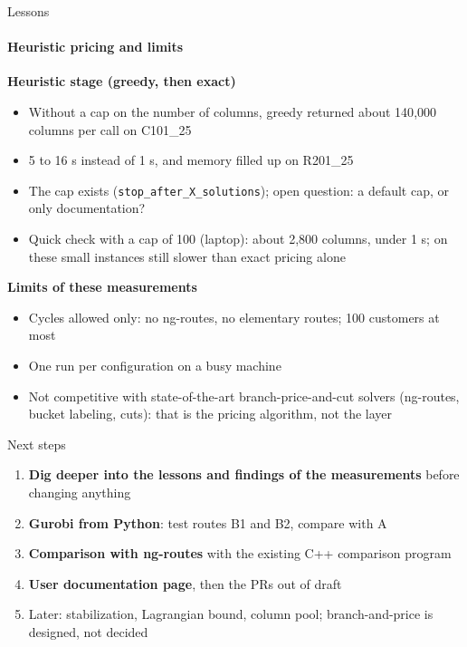 \documentclass[aspectratio=169]{beamer}
\begin{document}
\begin{frame}{Lessons}
  \framesubtitle{Heuristic pricing and limits}

  \textbf{Heuristic stage (greedy, then exact)}
  \begin{itemize}
    \item Without a cap on the number of columns, greedy returned about 140{,}000 columns per call on C101\_25
    \item 5 to 16 s instead of 1 s, and memory filled up on R201\_25
    \item The cap exists (\texttt{stop\_after\_X\_solutions}); open question: a default cap, or only documentation?
    \item Quick check with a cap of 100 (laptop): about 2{,}800 columns, under 1 s;
      on these small instances still slower than exact pricing alone
  \end{itemize}

  \vspace{0.4em}
  \textbf{Limits of these measurements}
  \begin{itemize}
    \item Cycles allowed only: no ng-routes, no elementary routes; 100 customers at most
    \item One run per configuration on a busy machine
    \item Not competitive with state-of-the-art branch-price-and-cut solvers (ng-routes, bucket labeling, cuts):
      that is the pricing algorithm, not the layer
  \end{itemize}
\end{frame}

\begin{frame}{Next steps}

  \begin{enumerate}
    \item \textbf{Dig deeper into the lessons and findings of the measurements} before changing anything
    \item \textbf{Gurobi from Python}: test routes B1 and B2, compare with A
    \item \textbf{Comparison with ng-routes} with the existing C++ comparison program
    \item \textbf{User documentation page}, then the PRs out of draft
    \item Later: stabilization, Lagrangian bound, column pool; branch-and-price is designed, not decided
  \end{enumerate}
\end{frame}
\end{document}
